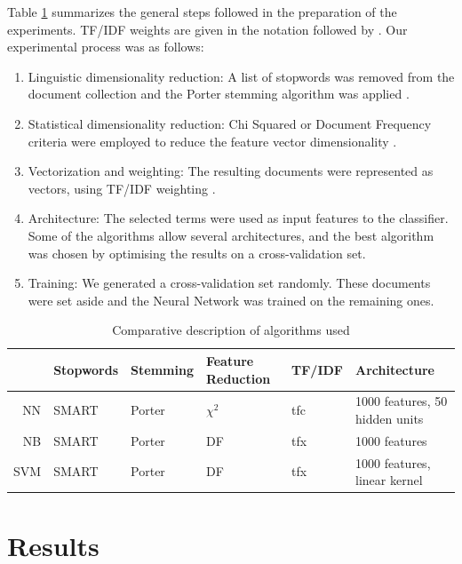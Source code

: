 \documentclass[twocolumn]{article}
\begin{document}
Table \ref{algos} summarizes the general steps followed in the
preparation of the experiments.  TF/IDF weights are given in the
notation followed by \cite{salton:88}.  Our experimental process was
as follows:

\begin{enumerate}

\item Linguistic dimensionality reduction: A list of stopwords
\cite{salton:89} was removed from the document collection and the
Porter stemming algorithm was applied \cite{manning:99}.
\item Statistical dimensionality reduction: Chi Squared or Document
Frequency criteria were employed to reduce the feature
vector dimensionality \cite{manning:99} \cite{sebastiani:02}.
\item Vectorization and weighting: The resulting documents were
represented as vectors, using TF/IDF weighting \cite{salton:88}
\cite{yang:97}.
\item Architecture: The selected terms were used as input features to
the classifier. Some of the algorithms allow several architectures,
and the best algorithm was chosen by optimising the results on a
cross-validation set.
\item Training: We generated a cross-validation set randomly. These
documents were set aside and the Neural Network was trained on the
remaining ones.


\end{enumerate}

\begin{table}
\begin{tabularx}{\linewidth}{|r|l|l|l|l|X|}
\hline
& Stopwords & Stemming & Feature Reduction & TF/IDF & Architecture\\
\hline
NN & SMART & Porter & $\chi^2$ & tfc & 1000 features, 50 hidden units \\
\hline
NB & SMART & Porter & DF & tfx & 1000 features \\
\hline
SVM & SMART & Porter & DF & tfx & 1000 features, linear kernel \\

\hline
\end{tabularx}
\caption{Comparative description of algorithms used}
\label{algos}
\end{table}


\section{Results}
\label{results}
\end{document}
